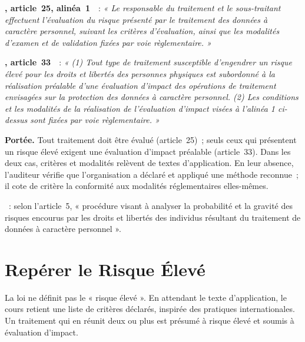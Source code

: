 \begin{boxjuris}
\textbf{, article~25, alinéa~1}~\cite{loi2024017}~:
\textit{« Le responsable du traitement et le sous-traitant effectuent
l'évaluation du risque présenté par le traitement des données à caractère
personnel, suivant les critères d'évaluation, ainsi que les modalités
d'examen et de validation fixées par voie règlementaire. »}

\medskip
\textbf{, article~33}~\cite{loi2024017}~:
\textit{« (1) Tout type de traitement susceptible d'engendrer un risque
élevé pour les droits et libertés des personnes physiques est subordonné à
la réalisation préalable d'une évaluation d'impact des opérations de
traitement envisagées sur la protection des données à caractère
personnel. (2) Les conditions et les modalités de la réalisation de
l'évaluation d'impact visées à l'alinéa 1 ci-dessus sont fixées par voie
règlementaire. »}

\smallskip
\textbf{Portée.} Tout traitement doit être évalué (article~25)~; seuls ceux
qui présentent un risque élevé exigent une évaluation d'impact préalable
(article~33). Dans les deux cas, critères et modalités relèvent de textes
d'application. En leur absence, l'auditeur vérifie que l'organisation a
déclaré et appliqué une méthode reconnue~; il cote \NEK{} de critère la
conformité aux modalités réglementaires elles-mêmes.
\end{boxjuris}

\begin{boxdef}
~: selon
l'article~5, « procédure visant à analyser la probabilité et la gravité des
risques encourus par les droits et libertés des individus résultant du
traitement de données à caractère personnel ».
\end{boxdef}

\section{Repérer le Risque Élevé}
\label{sec:c05-eleve}

La loi ne définit pas le « risque élevé ». En attendant le texte
d'application, le cours retient une liste de critères déclarés, inspirée des
pratiques internationales. Un traitement qui en réunit deux ou plus est
présumé à risque élevé et soumis à évaluation d'impact.

